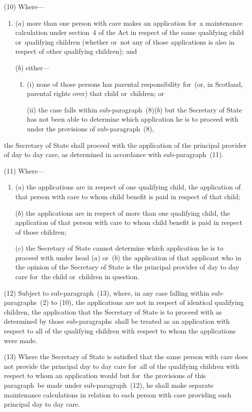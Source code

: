 \documentclass[12pt,a4paper]{article}
\begin{document}
(10) Where—
\begin{enumerate}\item[]
($a$) more than one person with care makes an application for~a maintenance calculation under section~4 of the Act in respect of the same qualifying child or~qualifying children (whether or~not any of those applications is also in respect of other qualifying children); and

($b$) either—
\begin{enumerate}\item[]
(i) none of those persons has parental responsibility for~(or, in Scotland, parental rights over) that child or~children; or

(ii) the case falls within sub-paragraph~(8)($b$)  but the Secretary of State has not been able to determine which application he is to proceed with under the provisions of sub-paragraph~(8),
\end{enumerate}
\end{enumerate}
the Secretary of State shall proceed with the application of the principal provider of day to day care, as determined in accordance with sub-paragraph~(11).

(11) Where—
\begin{enumerate}\item[]
($a$) the applications are in respect of one qualifying child, the application of that person with care to whom child benefit is paid in respect of that child;

($b$) the applications are in respect of more than one qualifying child, the application of that person with care to whom child benefit is paid in respect of those children;

($c$) the Secretary of State cannot determine which application he is to proceed with under head ($a$)  or~($b$)  the application of that applicant who in the opinion of the Secretary of State is the principal provider of day to day care for~the child or~children in question.
\end{enumerate}

(12) Subject to sub-paragraph~(13), where, in any case falling within sub-paragraphs~(2) to (10), the applications are not in respect of identical qualifying children, the application that the Secretary of State is to proceed with as determined by those sub-paragraphs~shall be treated as an application with respect to all of the qualifying children with respect to whom the applications were made.

(13) Where the Secretary of State is satisfied that the same person with care does not provide the principal day to day care for~all of the qualifying children with respect to whom an application would but for~the provisions of this paragraph~be made under sub-paragraph~(12), he shall make separate maintenance calculations in relation to each person with care providing such principal day to day care.
\end{document}
